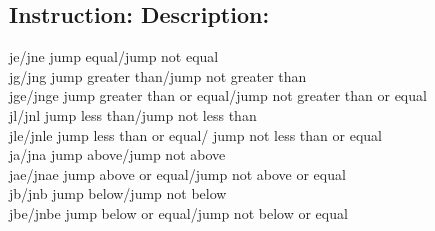 \documentclass[10pt]{book}
\begin{document}
\begin{center}
\begin{center}
\begin{center}
\begin{center}
\begin{center}
\section*{Instruction: Description:}
je/jne jump equal/jump not equal\\
jg/jng jump greater than/jump not greater than\\
jge/jnge jump greater than or equal/jump not greater than or equal\\
jl/jnl jump less than/jump not less than\\
jle/jnle jump less than or equal/ jump not less than or equal\\
ja/jna jump above/jump not above\\
jae/jnae jump above or equal/jump not above or equal\\
jb/jnb jump below/jump not below\\
jbe/jnbe jump below or equal/jump not below or equal


\end{center}
\end{center}
\end{center}
\end{center}
\end{center}
\end{document}
